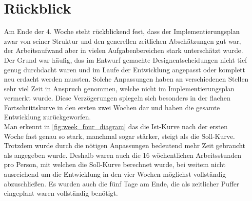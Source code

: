\section{Rückblick}
Am Ende der 4. Woche steht rückblickend fest, dass der Implementierungsplan zwar von seiner Struktur und den generellen zeitlichen Abschätzungen gut war, der Arbeitsaufwand aber in vielen Aufgabenbereichen stark unterschätzt wurde. Der Grund war häufig, das im Entwurf gemachte Designentscheidungen nicht tief genug durchdacht waren und im Laufe der Entwicklung angepasst oder komplett neu erdacht werden mussten. Solche Anpassungen haben an verschiedenen Stellen sehr viel Zeit in Anspruch genommen, welche nicht im Implementierungsplan vermerkt wurde. Diese Verzögerungen spiegeln sich besonders in der flachen Fortschrittskurve in den ersten zwei Wochen dar und haben die gesamte Entwicklung zurückgeworfen. \\
Man erkennt in \ref{fig:week_four_diagram} das die Ist-Kurve nach der ersten Woche fast genau so stark, manchmal sogar stärker, steigt als die Soll-Kurve. Trotzdem wurde durch die nötigen Anpassungen bedeutend mehr Zeit gebraucht als angegeben wurde. Deshalb waren auch die 16 wöchentlichen Arbeitsstunden pro Person, mit welchen die Soll-Kurve berechnet wurde, bei weitem nicht ausreichend um die Entwicklung in den vier Wochen möglichst vollständig abzuschließen. Es wurden auch die fünf Tage am Ende, die als zeitlicher Puffer eingeplant waren vollständig benötigt.